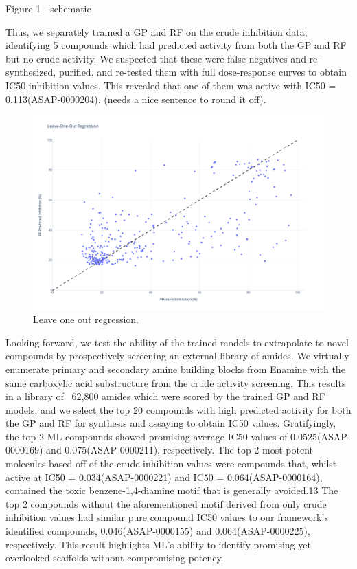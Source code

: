 Figure 1 - schematic

Thus, we separately trained a GP and RF on the crude inhibition data, identifying 5 compounds which had predicted activity from both the GP and RF but no crude activity. We suspected that these were false negatives and re-synthesized, purified, and re-tested them with full dose-response curves to obtain IC50 inhibition values. This revealed that one of them was active with IC50 = 0.113\uM (ASAP-0000204). (needs a nice sentence to round it off).

\begin{figure}
    \centering
             \includegraphics[width=\textwidth]{Chapters/Crude/Figs/rf.pdf}
        \caption{Leave one out regression. }
        \label{fig:leave-one-out}
    \end{figure}
    
Looking forward, we test the ability of the trained models to extrapolate to novel compounds by prospectively screening an external library of amides. We virtually enumerate primary and secondary amine building blocks from Enamine with the same carboxylic acid substructure from the crude activity screening. This results in a library of ~62,800 amides which were scored by the trained GP and RF models, and we select the top 20 compounds with high predicted activity for both the GP and RF for synthesis and assaying to obtain IC50 values. Gratifyingly, the top 2 ML compounds showed promising average IC50 values of 0.0525\uM (ASAP-0000169) and 0.075\uM (ASAP-0000211), respectively. The top 2 most potent molecules based off of the crude inhibition values were compounds that, whilst active at IC50 = 0.034\uM (ASAP-0000221) and IC50 = 0.064\uM (ASAP-0000164), contained the toxic benzene-1,4-diamine motif that is generally avoided.13 The top 2 compounds without the aforementioned motif derived from only crude inhibition values had similar pure compound IC50 values to our framework's identified compounds, 0.046\uM (ASAP-0000155) and 0.064\uM (ASAP-0000225), respectively. This result highlights ML's ability to identify promising yet overlooked scaffolds without compromising potency. 

